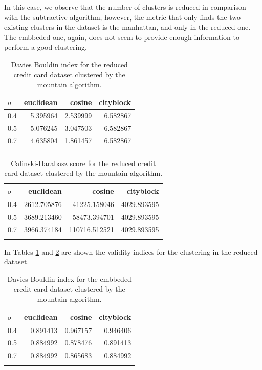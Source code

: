 \documentclass[conference]{IEEEtran}
\begin{document}
In this case, we observe that the number of clusters is reduced in comparison with the subtractive algorithm, however, the metric that only finds the two existing clusters in the dataset is the manhattan, and only in the reduced one. The embbeded one, again, does not seem to provide enough information to perform a good clustering.

\begin{table}[ht!]
    \centering
    \begin{tabular}{lrrr}
        \toprule
        $\sigma$ &  euclidean &    cosine &  cityblock \\
        \midrule
        0.4 &   5.395964 &  2.539999 &   6.582867 \\
        0.5 &   5.076245 &  3.047503 &   6.582867 \\
        0.7 &   4.635804 &  1.861457 &   6.582867 \\
        \bottomrule \\
        \end{tabular}
    \caption{Davies Bouldin index for the reduced credit card dataset clustered by the mountain algorithm.}
    \label{tab:c2_db_m}
\end{table}

\begin{table}[ht!]
    \centering
    \begin{tabular}{lrrr}
    \toprule
    $\sigma$ &    euclidean &         cosine &    cityblock \\
    \midrule
    0.4 &  2612.705876 &   41225.158046 &  4029.893595 \\
    0.5 &  3689.213460 &   58473.394701 &  4029.893595 \\
    0.7 &  3966.374184 &  110716.512521 &  4029.893595 \\
    \bottomrule \\
    \end{tabular}
    \caption{Calinski-Harabasz score for the reduced credit card dataset clustered by the mountain algorithm.}
    \label{tab:c2_ch_m}
    \end{table}
    
    In Tables \ref{tab:c2_db_m} and \ref{tab:c2_ch_m} are shown the validity indices for the clustering in the reduced dataset.
    
\begin{table}[ht!]
    \centering
    \begin{tabular}{lrrr}
        \toprule
        $\sigma$ &  euclidean &    cosine &  cityblock \\
        \midrule
        0.4 &   0.891413 &  0.967157 &   0.946406 \\
        0.5 &   0.884992 &  0.878476 &   0.891413 \\
        0.7 &   0.884992 &  0.865683 &   0.884992 \\
        \bottomrule \\
        \end{tabular}
    \caption{Davies Bouldin index for the embbeded credit card dataset clustered by the mountain algorithm.}
    \label{tab:ce_db_m}
\end{table}
\end{document}
